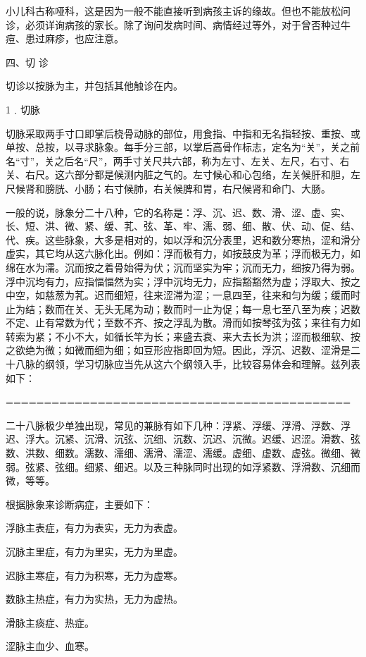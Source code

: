 \documentclass[12pt,UTF8]{ctexbook}
\begin{document}
小儿科古称哑科，这是因为一般不能直接听到病孩主诉的缘故。但也不能放松问诊，必须详询病孩的家长。除了询问发病时间、病情经过等外，对于曾否种过牛痘、患过麻疹，也应注意。

四、切 诊

切诊以按脉为主，并包括其他触诊在内。

1﹒切脉

切脉采取两手寸口即掌后桡骨动脉的部位，用食指、中指和无名指轻按、重按、或单按、总按，以寻求脉象。每手分三部，以掌后高骨作标志，定名为“关”，关之前名“寸”，关之后名“尺”，两手寸关尺共六部，称为左寸、左关、左尺，右寸、右关、右尺。这六部分都是候测内脏之气的。左寸候心和心包络，左关候肝和胆，左尺候肾和膀胱、小肠；右寸候肺，右关候脾和胃，右尺候肾和命门、大肠。

一般的说，脉象分二十八种，它的名称是：浮、沉、迟、数、滑、涩、虚、实、长、短、洪、微、紧、缓、芤、弦、革、牢、濡、弱、细、散、伏、动、促、结、代、疾。这些脉象，大多是相对的，如以浮和沉分表里，迟和数分寒热，涩和滑分虚实，其它均从这六脉化出。例如：浮而极有力，如按鼓皮为革；浮而极无力，如绵在水为濡。沉而按之着骨始得为伏；沉而坚实为牢；沉而无力，细按乃得为弱。浮中沉均有力，应指愊愊然为实；浮中沉均无力，应指豁豁然为虚；浮取大、按之中空，如慈葱为芤。迟而细短，往来涩滞为涩；一息四至，往来和匀为缓；缓而时止为结；数而在关、无头无尾为动；数而时一止为促；每一息七至八至为疾；迟数不定、止有常数为代；至数不齐、按之浮乱为散。滑而如按琴弦为弦；来往有力如转索为紧；不小不大，如循长竿为长；来盛去衰、来大去长为洪；涩而极细软、按之欲绝为微；如微而细为细；如豆形应指即回为短。因此，浮沉、迟数、涩滑是二十八脉的纲领，学习切脉应当先从这六个纲领入手，比较容易体会和理解。兹列表如下：

=============================================

二十八脉极少单独出现，常见的兼脉有如下几种：浮紧、浮缓、浮滑、浮数、浮迟、浮大。沉紧、沉滑、沉弦、沉细、沉数、沉迟、沉微。迟缓、迟涩。滑数、弦数、洪数、细数。濡数、濡细、濡滑、濡涩、濡缓。虚细、虚数、虚弦。微细、微弱。弦紧、弦细。细紧、细迟。以及三种脉同时出现的如浮紧数、浮滑数、沉细而微，等等。

根据脉象来诊断病症，主要如下：

浮脉主表症，有力为表实，无力为表虚。

沉脉主里症，有力为里实，无力为里虚。

迟脉主寒症，有力为积寒，无力为虚寒。

数脉主热症，有力为实热，无力为虚热。

滑脉主痰症、热症。

涩脉主血少、血寒。
\end{document}
